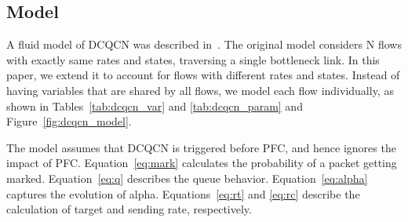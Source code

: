 \subsection{Model}

A fluid model of DCQCN was described in~\cite{dcqcn}. The original model considers N flows 
with exactly same rates and states, traversing a single bottleneck link. 
In this paper, we extend it to account for flows with different rates and states.
Instead of having variables that are shared by all flows, we model each flow individually,
as shown in Tables~\ref{tab:dcqcn_var} and \ref{tab:dcqcn_param} and
Figure~\ref{fig:dcqcn_model}.

The model assumes that DCQCN is triggered before PFC, and hence
ignores the impact of PFC. Equation~\ref{eq:mark} calculates the probability of
a packet getting marked.  Equation~\ref{eq:q} describes the queue behavior.
Equation~\ref{eq:alpha} captures the evolution of alpha.  Equations~\ref{eq:rt}
and \ref{eq:rc} describe the calculation of target and sending rate,
respectively. 
